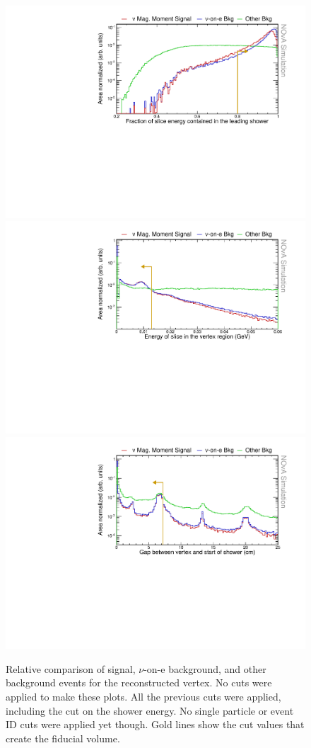 \begin{figure}[hbtp]
\centering
\includegraphics[width=.9\textwidth]{Plots/NuMMEventSelection/LogY_N1Cut_shwEFracE.pdf}
\includegraphics[width=.9\textwidth]{Plots/NuMMEventSelection/LogY_N1Cut_vtxEE.pdf}
\includegraphics[width=.9\textwidth]{Plots/NuMMEventSelection/LogY_N1Cut_gapEE.pdf}
\caption{Relative comparison of signal, $\nu$-on-e background, and other background events for the reconstructed vertex. No cuts were applied to make these plots. All the previous cuts were applied, including the cut on the shower energy. No single particle or event ID cuts were applied yet though. Gold lines show the cut values that create the fiducial volume.}
\label{fig:SingleShowerCuts}
\end{figure}

